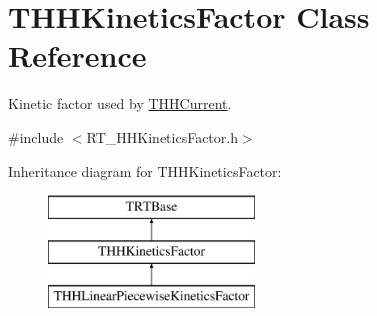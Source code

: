 \hypertarget{class_t_h_h_kinetics_factor}{\section{T\+H\+H\+Kinetics\+Factor Class Reference}
\label{class_t_h_h_kinetics_factor}
}


Kinetic factor used by \hyperlink{class_t_h_h_current}{T\+H\+H\+Current}.  




{\ttfamily \#include $<$R\+T\+\_\+\+H\+H\+Kinetics\+Factor.\+h$>$}

Inheritance diagram for T\+H\+H\+Kinetics\+Factor\+:\begin{figure}[H]
\begin{center}
\leavevmode
\includegraphics[height=3.000000cm]{class_t_h_h_kinetics_factor}
\end{center}
\end{figure}
